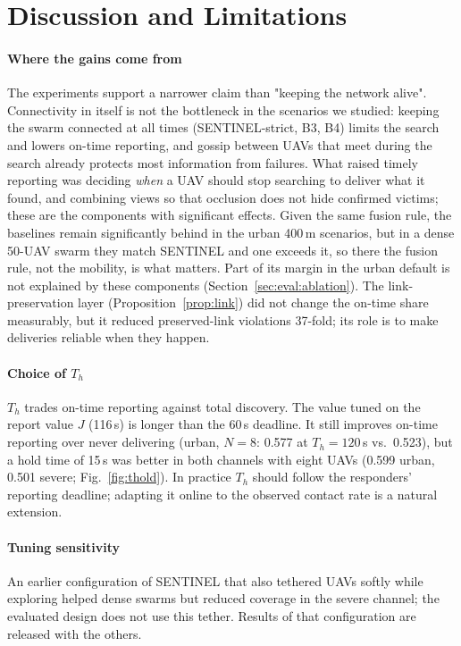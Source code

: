\section{Discussion and Limitations}\label{sec:discussion}

\paragraph{Where the gains come from}
The experiments support a narrower claim than "keeping the network alive". Connectivity in itself
is not the bottleneck in the scenarios we studied: keeping the swarm connected at all times
(SENTINEL-strict, B3, B4) limits the search and lowers on-time reporting, and gossip between UAVs
that meet during the search already protects most information from failures. What raised timely
reporting was deciding \emph{when} a UAV should stop searching to deliver what it found, and
combining views so that occlusion does not hide confirmed victims; these are the components with
significant effects. Given the same fusion rule, the baselines remain significantly behind in the
urban 400\,m scenarios, but in a dense 50-UAV swarm they match SENTINEL and one exceeds it, so there
the fusion rule, not the mobility, is what matters. Part
of its margin in the urban default is not explained by these components
(Section~\ref{sec:eval:ablation}). The link-preservation layer (Proposition~\ref{prop:link}) did not
change the on-time share measurably, but it reduced preserved-link violations 37-fold; its role is to
make deliveries reliable when they happen.

\paragraph{Choice of $T_h$}
$T_h$ trades on-time reporting against total discovery. The value tuned on the report value $J$
(116\,s) is longer than the 60\,s deadline. It still improves on-time reporting over never
delivering (urban, $N=8$: 0.577 at $T_h=120$\,s vs.\ 0.523), but a hold time of 15\,s was better in
both channels with eight UAVs (0.599 urban, 0.501 severe; Fig.~\ref{fig:thold}). In practice $T_h$ should follow the responders' reporting deadline; adapting it online to the
observed contact rate is a natural extension.

\paragraph{Tuning sensitivity}
An earlier configuration of SENTINEL that also tethered UAVs softly while exploring helped dense
swarms but reduced coverage in the severe channel; the evaluated design does not use this tether.
Results of that configuration are released with the others.


